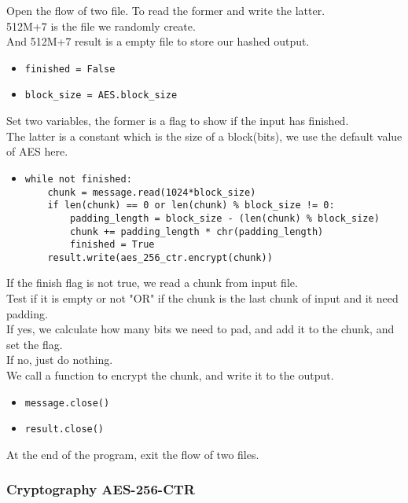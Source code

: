 \documentclass{article}
\begin{document}
\noindent Open the flow of two file. To read the former and write the latter.\\
512M+7 is the file we randomly create.\\
And 512M+7 result is a empty file to store our hashed output.

\begin{itemize}
\item \verb|finished = False|
\item \verb|block_size = AES.block_size|
\end{itemize}

\noindent Set two variables, the former is a flag to show if the input has finished.\\
The latter is a constant which is the size of a block(bits), we use the default value of AES here.

\begin{itemize}
\item \begin{verbatim}while not finished:
    chunk = message.read(1024*block_size)
    if len(chunk) == 0 or len(chunk) % block_size != 0:
        padding_length = block_size - (len(chunk) % block_size)
        chunk += padding_length * chr(padding_length)
        finished = True
    result.write(aes_256_ctr.encrypt(chunk))
\end{verbatim}
\end{itemize}

\noindent If the finish flag is not true, we read a chunk from input file.\\
Test if it is empty or not "OR" if the chunk is the last chunk of input and it need padding.\\
If yes, we calculate how many bits we need to pad, and add it to the chunk, and set the flag.\\
If no, just do nothing.\\
We call a function to encrypt the chunk, and write it to the output.

\begin{itemize}
\item \verb|message.close()|
\item \verb|result.close()|
\end{itemize}

\noindent At the end of the program, exit the flow of two files.\\

\subsubsection{Cryptography AES-256-CTR}
\end{document}

